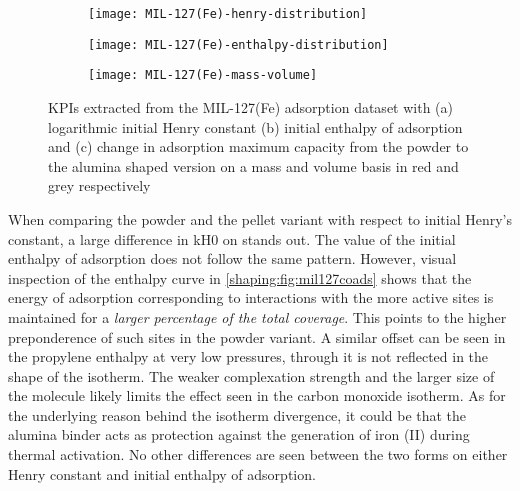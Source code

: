 \begin{figure}[p!]
	\centering
	\begin{subfigure}{\linewidth}
		\parbox[c]{0.1\linewidth}{\caption{}%
			\label{shaping:fig:analysismil127henry}}%
		\parbox[b]{0.8\linewidth}{%
			\texttt{[image: MIL-127(Fe)-henry-distribution]}%
		}%
	\end{subfigure}%

	\begin{subfigure}{\linewidth}
		\parbox[c]{0.1\linewidth}{\caption{}%
			\label{shaping:fig:analysismil127enth}}%
		\parbox[b]{0.8\linewidth}{%
			\texttt{[image: MIL-127(Fe)-enthalpy-distribution]}%
		}%
	\end{subfigure}%

	\begin{subfigure}{\linewidth}
		\parbox[c]{0.1\linewidth}{\caption{}%
			\label{shaping:fig:analysismil127basis}}%
		\parbox[b]{0.8\linewidth}{%
			\texttt{[image: MIL-127(Fe)-mass-volume]}%
		}%
	\end{subfigure}%

	\caption{\glspl{KPI} extracted from the MIL-127(Fe) adsorption dataset with
		(a) logarithmic initial Henry constant (b) initial enthalpy of
        adsorption and (c) change in adsorption maximum capacity from 
        the powder to the alumina shaped version on a mass and volume 
        basis in red and grey respectively}%
	\label{shaping:fig:analysismil127}
\end{figure}

When comparing the powder and the pellet variant with respect to
initial Henry's constant, a large difference in \gls{kH0} on 
stands out. The value of the initial enthalpy of adsorption
does not follow the same pattern.
However, visual inspection of the enthalpy curve in
\autoref{shaping:fig:mil127coads} shows that the energy of
adsorption corresponding to
interactions with the more active sites is maintained for a \textit{larger
percentage of the total coverage}.
This points to the higher preponderence of such sites in the powder
variant. A similar offset can be seen in the propylene enthalpy at very
low pressures, through it is not reflected in the shape of the isotherm.
The weaker complexation strength and the larger size of the molecule
likely limits the effect seen in the carbon monoxide isotherm.
As for the underlying reason behind the isotherm divergence, it
could be that the alumina binder acts as protection against the
generation of iron (II) during thermal activation.
No other differences are seen between the two forms on either Henry
constant and initial enthalpy of adsorption.

